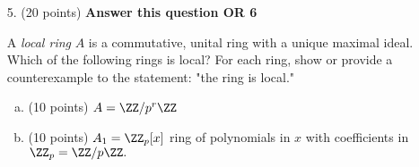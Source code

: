 \documentclass{article}
\begin{document}
\begin{itemize}
\begin{enumerate}[(a)]
\begin{proof}
					Thus, $n=4$ is the smallest integer that satisfies $x^n-1\in I,$ and we know this is true because $x^4-1\equiv1-1=0$ in $\ZZ_5.$ Thus, the order of $\overline x$ is 
				\end{proof}

			\item (5 points) Find, if exists, a coset of order 3 in $F^\times.$
				\begin{soln}
					Let $f\in \ZZ_5[x]$ such that $\deg f\le 1.$ Then suppose the coset $f+I$ has order 3, then 
					\[(f+I)^3=f^3+I=1+I\implies f^3-1\in I\]
					We can simplify by assuming $\deg f\le 1,$ so $f=ax+b,$ and 
					\begin{align*}
						(ax+b)^3-1 &= (ax+b-1)\left[ (ax+b)^2+(ax+b)+1 \right] \in I
					\end{align*}
					If this is in $I,$ then $x^2+2x+3$ divides this product, and since $x^2+2x+3$ is irreducible in $\ZZ_5[x],$ it must divide the quadratic part:
					\[q(x^2+2x+3) = (ax+b)^2+(ax+b)+1 = a^2x^2 + (2ab+a)x + (b^2+b+1)\]
					The only possibility is $q=a^2,$ so 
					\[a^2(x^2+2x+3)=a^2+2a^2x+3a^2 = a^2x^2 + (2ab+a)x + (b^2+b+1)\]
					and equating coefficients, we have
					\begin{align*}
						2a^2 &= 2ab+a \\
						3a^2 &= b^2+b+1
					\end{align*}
					Since $\ZZ_5$ is an integral domain, the first equation implies that $2a=2b+1,$ which is impossible. Thus, there are no solutions for $a$ and $b,$ so no such $f$ exists, and there is no coset of order 3 in $F^\times.$
				\end{soln}
				
		\end{enumerate}

		\newpage

	\item[5.] (20 points) \textbf{Answer this question OR 6}

		A \textit{local ring} $A$ is a commutative, unital ring with a unique maximal ideal. Which of the following rings is local? For each ring, show or provide a counterexample to the statement: "the ring is local."
		\begin{enumerate}[(a)]
			\item (10 points) $A=\ZZ/p^r\ZZ$

			\item (10 points) $A_1=\ZZ_p[x]$ ring of polynomials in $x$ with coefficients in $\ZZ_p=\ZZ/p\ZZ.$
				

\end{enumerate}
\end{itemize}
\end{document}
